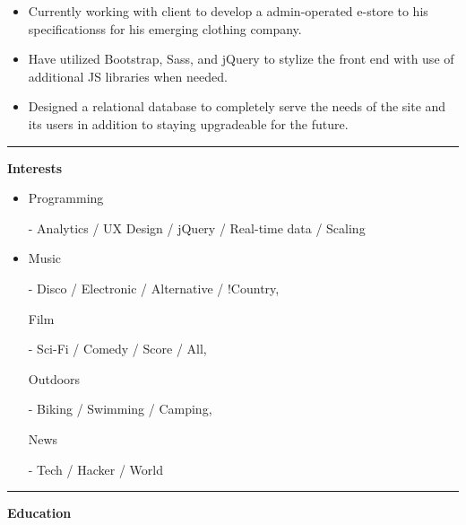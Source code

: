 \documentclass[11pt]{article}
\begin{document}
\vspace{-0.8em} 
\begin{itemize}
	\item Currently working with client to develop a admin-operated e-store to his specificationss for his emerging clothing company.
	\vspace{-0.6em} 
	\item Have utilized Bootstrap, Sass, and jQuery to stylize the front end with use of additional JS libraries when needed.
	\vspace{-0.6em}
	\item Designed a relational database to completely serve the needs of the site and its users in addition to staying upgradeable for the future.
	\vspace{-0.8em}
	
\end{itemize}

\vspace{0.5em}

\hrule
\vspace{0.6em}
\begin{LARGE}
\bf Interests
\end{LARGE}

\vspace{-0.5em}

\begin{itemize}
\item \begin{bf}Programming\end{bf} - Analytics / UX Design / jQuery / Real-time data / Scaling
\vspace{-0.6em}
\item \begin{bf}Music\end{bf} - Disco / Electronic / Alternative / !Country, \begin{bf}Film\end{bf} - Sci-Fi / Comedy / Score / All, \begin{bf}Outdoors\end{bf} - Biking / Swimming / Camping, \begin{bf}News\end{bf} - Tech / Hacker / World
\end{itemize}

\hrule
\vspace{0.5em}

\begin{LARGE}\bf{Education}\end{LARGE} \begin{Large}
	
\end{Large}
\end{document}
